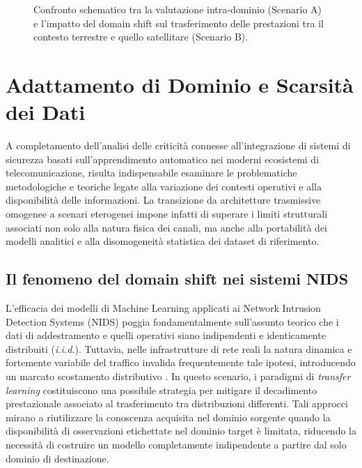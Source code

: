 \begin{figure}[H]
    \caption{Confronto schematico tra la valutazione intra-dominio (Scenario A) e l'impatto del domain shift sul trasferimento delle prestazioni tra il contesto terrestre e quello satellitare (Scenario B).}
    \label{fig:domain_shift_concept}
\end{figure}

\section{Adattamento di Dominio e Scarsità dei Dati}
\label{sec:domain_shift_data}

A completamento dell'analisi delle criticità connesse all'integrazione di sistemi di sicurezza basati sull'apprendimento automatico nei moderni ecosistemi di telecomunicazione, risulta indispensabile esaminare le problematiche metodologiche e teoriche legate alla variazione dei contesti operativi e alla disponibilità delle informazioni. 
La transizione da architetture trasmissive omogenee a scenari eterogenei impone infatti di superare i limiti strutturali associati non solo alla natura fisica dei canali, ma anche alla portabilità dei modelli analitici e alla disomogeneità statistica dei dataset di riferimento.

\subsection{Il fenomeno del domain shift nei sistemi NIDS}
\label{subsec:domain_shift_nids}

L'efficacia dei modelli di Machine Learning applicati ai Network Intrusion Detection Systems (NIDS) poggia fondamentalmente sull'assunto teorico che i dati di addestramento e quelli operativi siano indipendenti e identicamente distribuiti (\textit{i.i.d.}). 
Tuttavia, nelle infrastrutture di rete reali la natura dinamica e fortemente variabile del traffico invalida frequentemente tale ipotesi, introducendo un marcato scostamento distributivo \cite{pan2010}. 
In questo scenario, i paradigmi di \textit{transfer learning} costituiscono una possibile strategia per mitigare il decadimento prestazionale associato al trasferimento tra distribuzioni differenti.
Tali approcci mirano a riutilizzare la conoscenza acquisita nel dominio sorgente quando la disponibilità di osservazioni etichettate nel dominio target è limitata, riducendo la necessità di costruire un modello completamente indipendente a partire dal solo dominio di destinazione.

